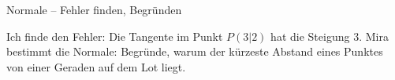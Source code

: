 \begin{aufgabe}{Normale – Fehler finden, Begründen}
\begin{teile}
\teil Ich finde den Fehler: Die Tangente im Punkt $P(3 | 2)$ hat die Steigung $3$. Mira bestimmt die Normale: 
\teil Begründe, warum der kürzeste Abstand eines Punktes von einer Geraden auf dem Lot liegt.
\end{teile}
\end{aufgabe}
